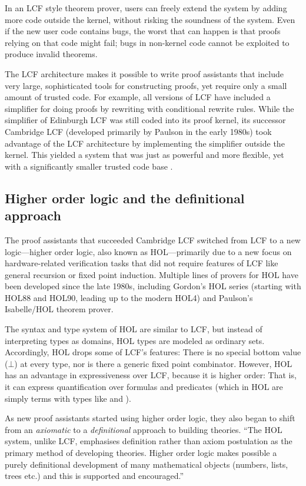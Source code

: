 In an LCF style theorem prover, users can freely extend the system by adding more code outside the kernel, without risking the soundness of the system. Even if the new user code contains bugs, the worst that can happen is that proofs relying on that code might fail; bugs in non-kernel code cannot be exploited to produce invalid theorems.

The LCF architecture makes it possible to write proof assistants that include very large, sophisticated tools for constructing proofs, yet require only a small amount of trusted code. For example, all versions of LCF have included a simplifier for doing proofs by rewriting with conditional rewrite rules. While the simplifier of Edinburgh LCF was still coded into its proof kernel, its successor Cambridge LCF (developed primarily by Paulson in the early 1980s) took advantage of the LCF architecture by implementing the simplifier outside the kernel. This yielded a system that was just as powerful and more flexible, yet with a significantly smaller trusted code base \cite{paulson87lcf}.

\subsection{Higher order logic and the definitional approach}

The proof assistants that succeeded Cambridge LCF switched from LCF to a new logic---higher order logic, also known as HOL---primarily due to a new focus on hardware-related verification tasks that did not require features of LCF like general recursion or fixed point induction. Multiple lines of provers for HOL have been developed since the late 1980s, including Gordon's HOL series (starting with HOL88 and HOL90, leading up to the modern HOL4) and Paulson's Isabelle/HOL theorem prover.

The syntax and type system of HOL are similar to LCF, but instead of interpreting types as domains, HOL types are modeled as ordinary sets. Accordingly, HOL drops some of LCF's features: There is no special bottom value ($\bot$) at every type, nor is there a generic fixed point combinator. However, HOL has an advantage in expressiveness over LCF, because it is higher order: That is, it can express quantification over formulas and predicates (which in HOL are simply terms with types like  and ).

As new proof assistants started using higher order logic, they also began to shift from an \emph{axiomatic} to a \emph{definitional} approach to building theories. ``The HOL system, unlike LCF, emphasises definition rather than axiom postulation as the primary method of developing theories. Higher order logic makes possible a purely definitional development of many mathematical objects (numbers, lists, trees etc.) and this is supported and encouraged.'' \cite[\S5.2]{Gordon2000}


